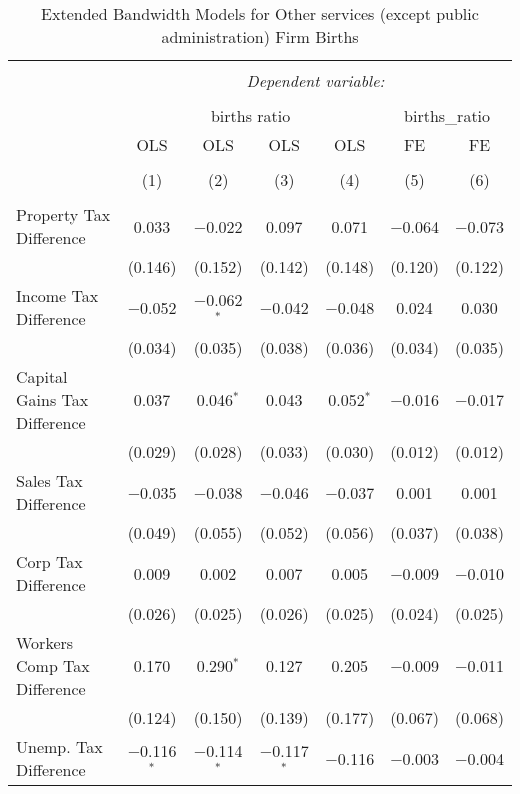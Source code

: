 
\begin{table}[!htbp] \centering 
  \caption{Extended Bandwidth Models for  Other services (except public administration) Firm Births} 
  \label{81eb} 
\begin{tabular}{@{\extracolsep{5pt}}lcccccc} 
\\[-1.8ex]\hline 
\hline \\[-1.8ex] 
 & \multicolumn{6}{c}{\textit{Dependent variable:}} \\ 
\cline{2-7} 
\\[-1.8ex] & \multicolumn{4}{c}{births ratio} & \multicolumn{2}{c}{births\_ratio} \\ 
 & OLS & OLS & OLS & OLS & FE & FE \\ 
\\[-1.8ex] & (1) & (2) & (3) & (4) & (5) & (6)\\ 
\hline \\[-1.8ex] 
 Property Tax Difference & 0.033 & $-$0.022 & 0.097 & 0.071 & $-$0.064 & $-$0.073 \\ 
  & (0.146) & (0.152) & (0.142) & (0.148) & (0.120) & (0.122) \\ 
  Income Tax Difference & $-$0.052 & $-$0.062$^{*}$ & $-$0.042 & $-$0.048 & 0.024 & 0.030 \\ 
  & (0.034) & (0.035) & (0.038) & (0.036) & (0.034) & (0.035) \\ 
  Capital Gains Tax Difference & 0.037 & 0.046$^{*}$ & 0.043 & 0.052$^{*}$ & $-$0.016 & $-$0.017 \\ 
  & (0.029) & (0.028) & (0.033) & (0.030) & (0.012) & (0.012) \\ 
  Sales Tax Difference & $-$0.035 & $-$0.038 & $-$0.046 & $-$0.037 & 0.001 & 0.001 \\ 
  & (0.049) & (0.055) & (0.052) & (0.056) & (0.037) & (0.038) \\ 
  Corp Tax Difference & 0.009 & 0.002 & 0.007 & 0.005 & $-$0.009 & $-$0.010 \\ 
  & (0.026) & (0.025) & (0.026) & (0.025) & (0.024) & (0.025) \\ 
  Workers Comp Tax Difference & 0.170 & 0.290$^{*}$ & 0.127 & 0.205 & $-$0.009 & $-$0.011 \\ 
  & (0.124) & (0.150) & (0.139) & (0.177) & (0.067) & (0.068) \\ 
  Unemp. Tax Difference & $-$0.116$^{*}$ & $-$0.114$^{*}$ & $-$0.117$^{*}$ & $-$0.116 & $-$0.003 & $-$0.004 \\ 

\end{tabular}
\end{table}
